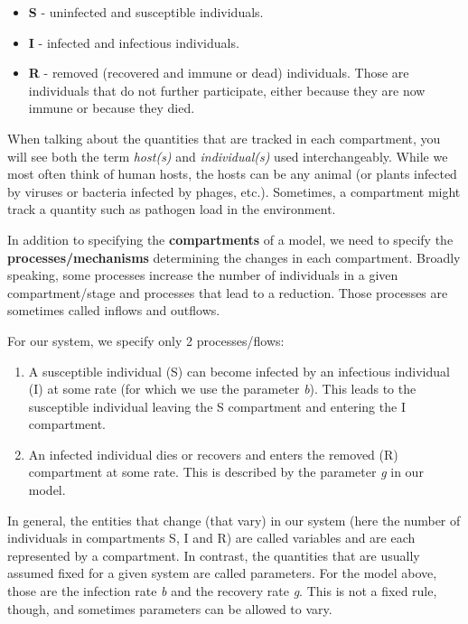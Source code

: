 \documentclass[]{book}
\providecommand{\tightlist}{%
  \setlength{\itemsep}{0pt}\setlength{\parskip}{0pt}}
\theoremstyle{definition}
\theoremstyle{definition}
\theoremstyle{definition}
\theoremstyle{remark}
\begin{document}
\begin{itemize}
\tightlist
\item
  \textbf{S} - uninfected and susceptible individuals.
\item
  \textbf{I} - infected and infectious individuals.
\item
  \textbf{R} - removed (recovered and immune or dead) individuals. Those
  are individuals that do not further participate, either because they
  are now immune or because they died.
\end{itemize}

When talking about the quantities that are tracked in each compartment,
you will see both the term \emph{host(s)} and \emph{individual(s)} used
interchangeably. While we most often think of human hosts, the hosts can
be any animal (or plants infected by viruses or bacteria infected by
phages, etc.). Sometimes, a compartment might track a quantity such as
pathogen load in the environment.

In addition to specifying the \textbf{compartments} of a model, we need
to specify the \textbf{processes/mechanisms} determining the changes in
each compartment. Broadly speaking, some processes increase the number
of individuals in a given compartment/stage and processes that lead to a
reduction. Those processes are sometimes called inflows and outflows.

For our system, we specify only 2 processes/flows:

\begin{enumerate}
\def\labelenumi{\arabic{enumi}.}
\tightlist
\item
  A susceptible individual (S) can become infected by an infectious
  individual (I) at some rate (for which we use the parameter \emph{b}).
  This leads to the susceptible individual leaving the S compartment and
  entering the I compartment.\\
\item
  An infected individual dies or recovers and enters the removed (R)
  compartment at some rate. This is described by the parameter \emph{g}
  in our model.
\end{enumerate}

In general, the entities that change (that vary) in our system (here the
number of individuals in compartments S, I and R) are called variables
and are each represented by a compartment. In contrast, the quantities
that are usually assumed fixed for a given system are called parameters.
For the model above, those are the infection rate \emph{b} and the
recovery rate \emph{g}. This is not a fixed rule, though, and sometimes
parameters can be allowed to vary.
\end{document}
